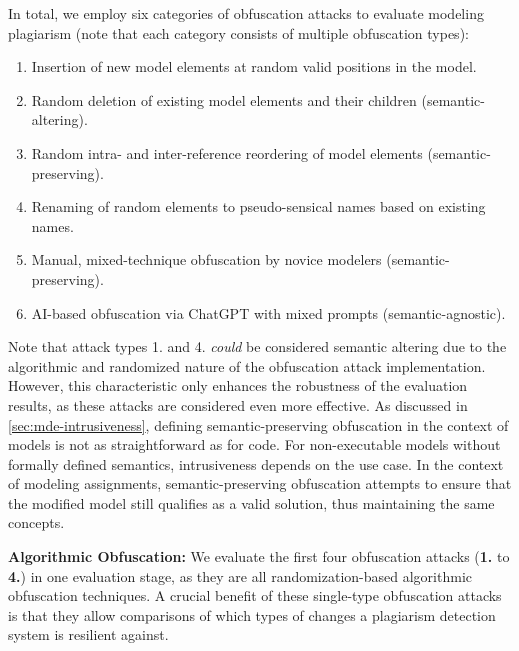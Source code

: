 In total, we employ six categories of obfuscation attacks to evaluate modeling plagiarism (note that each category consists of multiple obfuscation types):
\begin{enumerate}
\small
\item Insertion of new model elements at random valid positions in the model.
\item Random deletion of existing model elements and their children (semantic-altering).
\item Random intra- and inter-reference reordering of model elements (semantic-preserving).
\item Renaming of random elements to pseudo-sensical names based on existing names.
\item Manual, mixed-technique obfuscation by novice modelers (semantic-preserving).
\item AI-based obfuscation via ChatGPT with mixed prompts (semantic-agnostic).
\end{enumerate}
Note that attack types 1. and 4. \textit{could} be considered semantic altering due to the algorithmic and randomized nature of the obfuscation attack implementation. However, this characteristic only enhances the robustness of the evaluation results, as these attacks are considered even more effective.
As discussed in \autoref{sec:mde-intrusiveness}, defining semantic-preserving obfuscation in the context of models is not as straightforward as for code. For non-executable models without formally defined semantics, intrusiveness depends on the use case.
In the context of modeling assignments, semantic-preserving obfuscation attempts to ensure that the modified model still qualifies as a valid solution, thus maintaining the same concepts.

\textbf{Algorithmic Obfuscation:}
We evaluate the first four obfuscation attacks (\textbf{1.} to \textbf{4.}) in one evaluation stage, as they are all randomization-based algorithmic obfuscation techniques. A crucial benefit of these single-type obfuscation attacks is that they allow comparisons of which types of changes a plagiarism detection system is resilient against.

